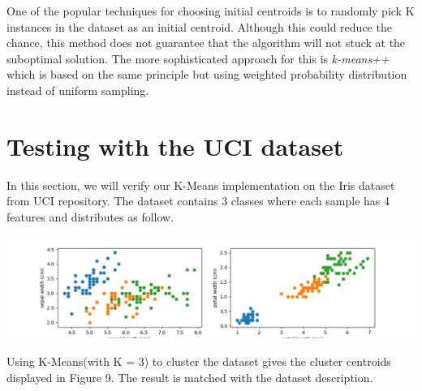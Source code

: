 \documentclass{article}
\begin{document}
One of the popular techniques for choosing initial centroids is to randomly pick K instances in the dataset as an initial centroid. Although this could reduce the chance, this method does not guarantee that the algorithm will not stuck at the suboptimal solution. The more sophisticated approach for this is \textit{k-means++}\cite{kmpp} which is based on the same principle but using weighted probability distribution instead of uniform sampling.

\section{Testing with the UCI dataset}
In this section, we will verify our K-Means implementation on the Iris dataset from UCI repository. The dataset contains 3 classes where each sample has 4 features and distributes as follow.
\begin{center}
\includegraphics[scale=0.3]{iris_dist}
\end{center}
Using K-Means(with K = 3) to cluster the dataset gives the cluster centroids displayed in Figure 9. The result is matched with the dataset description.
\end{document}
